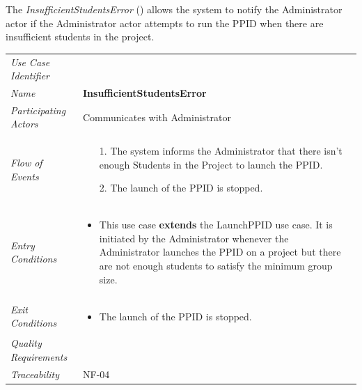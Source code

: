 \documentclass[12pt,letterpaper]{article}
\begin{document}
\newpage{}

The {\it InsufficientStudentsError} () allows the system to notify the Administrator actor if the Administrator actor attempts to run the PPID when there are
insufficient students in the project.

\begin{center}
	\begin{tabu} to 
		\toprule
		Use Case Identifier &  \\
		Name & {\bf InsufficientStudentsError} \\
		Participating Actors & Communicates with Administrator \\
		Flow of Events & 
		\begin{minipage}[t]{\linewidth}
		    \begin{enumerate}
			    \item[1.] The system informs the Administrator that there isn't enough Students in the Project to launch the PPID.
			    \item[2.] The launch of the PPID is stopped.
			\end{enumerate}
	    \end{minipage} \\

		Entry Conditions &
		\begin{minipage}[t]{\linewidth}
			\begin{itemize}
			    \item This use case \textbf{extends} the LaunchPPID use case. It is initiated by the Administrator whenever the Administrator launches the PPID on a project but there are not enough students to satisfy the minimum group size.
	        \end{itemize}
	    \end{minipage} \\

		Exit Conditions &
		\begin{minipage}[t]{\linewidth}
			\begin{itemize}
			    \item The launch of the PPID is stopped.
	        \end{itemize}
	    \end{minipage} \\

		Quality Requirements & \\

		Traceability & NF-04 \\
		\toprule
	\end{tabu}
\end{center}
\end{document}
